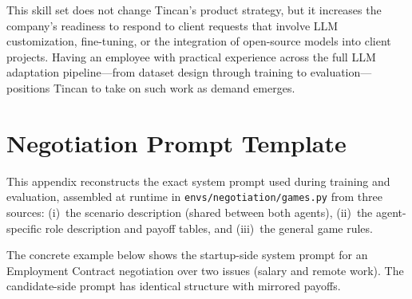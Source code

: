 \documentclass[12pt,a4paper]{article}
\begin{document}
This skill set does not change Tincan's product strategy, but it increases the company's readiness to respond to client requests that involve LLM customization, fine-tuning, or the integration of open-source models into client projects. Having an employee with practical experience across the full LLM adaptation pipeline---from dataset design through training to evaluation---positions Tincan to take on such work as demand emerges.


\newpage
\appendix

\section{Negotiation Prompt Template}
\label{app:prompt}

This appendix reconstructs the exact system prompt used during training and evaluation, assembled at runtime in \texttt{envs/negotiation/games.py} from three sources: (i)~the scenario description (shared between both agents), (ii)~the agent-specific role description and payoff tables, and (iii)~the general game rules.

The concrete example below shows the startup-side system prompt for an Employment Contract negotiation over two issues (salary and remote work). The candidate-side prompt has identical structure with mirrored payoffs.
\end{document}
